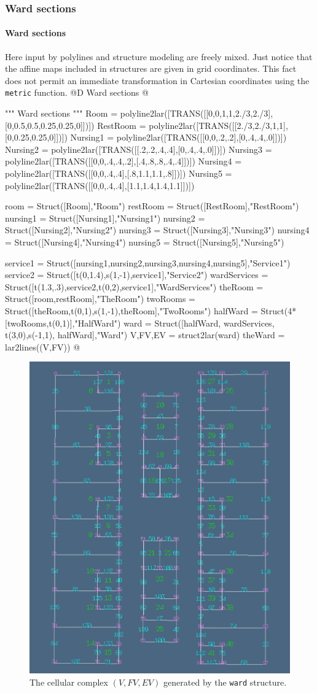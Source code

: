 \documentclass[11pt,oneside]{article}    %
\begin{document}
\subsubsection{Ward sections}
\paragraph{Ward sections}
Here input by polylines and structure modeling are freely mixed. Just notice that
the affine maps included in structures are given in grid coordinates. This fact 
does not permit an immediate transformation in Cartesian coordinates using the \texttt{metric}
function.
@D Ward sections
@{""" Ward sections """
Room = polyline2lar([TRANS([[0,0,1,1,2./3,2./3],[0,0.5,0.5,0.25,0.25,0]])])
RestRoom = polyline2lar([TRANS([[2./3,2./3,1,1],[0,0.25,0.25,0]])])
Nursing1 = polyline2lar([TRANS([[0,0,.2,.2],[0,.4,.4,.0]])])
Nursing2 = polyline2lar([TRANS([[.2,.2,.4,.4],[0,.4,.4,.0]])])
Nursing3 = polyline2lar([TRANS([[0,0,.4,.4,.2],[.4,.8,.8,.4,.4]])])
Nursing4 = polyline2lar([TRANS([[0,0,.4,.4],[.8,1.1,1.1,.8]])])
Nursing5 = polyline2lar([TRANS([[0,0,.4,.4],[1.1,1.4,1.4,1.1]])])

room = Struct([Room],"Room")
restRoom = Struct([RestRoom],"RestRoom")
nursing1 = Struct([Nursing1],"Nursing1")
nursing2 = Struct([Nursing2],"Nursing2")
nursing3 = Struct([Nursing3],"Nursing3")
nursing4 = Struct([Nursing4],"Nursing4")
nursing5 = Struct([Nursing5],"Nursing5")

service1 = Struct([nursing1,nursing2,nursing3,nursing4,nursing5],"Service1")
service2 = Struct([t(0,1.4),s(1,-1),service1],"Service2")
wardServices = Struct([t(1.3,.3),service2,t(0,2),service1],"WardServices")
theRoom = Struct([room,restRoom],"TheRoom")
twoRooms =  Struct([theRoom,t(0,1),s(1,-1),theRoom],"TwoRooms")
halfWard = Struct(4*[twoRooms,t(0,1)],"HalfWard")
ward = Struct([halfWard, wardServices, t(3,0),s(-1,1), halfWard],"Ward")
V,FV,EV = struct2lar(ward)
theWard = lar2lines((V,FV))
@}

\begin{figure}[htbp] %
   \centering
   \includegraphics[width=0.5\linewidth]{images/ward} 
   \caption{The cellular complex $(V,FV,EV)$ generated by the \texttt{ward} structure.}
   \label{fig:ward}
\end{figure}
\end{document}
